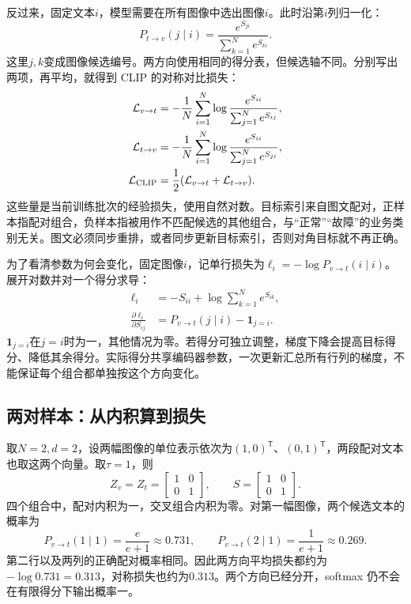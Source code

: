 反过来，固定文本$i$，模型需要在所有图像中选出图像$i$。此时沿第$i$列归一化：
\begin{equation}
 P_{t\to v}(j\mid i)=\frac{e^{S_{ji}}}{\sum_{k=1}^N e^{S_{ki}}}.
\end{equation}
这里$j,k$变成图像候选编号。两方向使用相同的得分表，但候选轴不同。分别写出两项，再平均，就得到 CLIP 的对称对比损失：
\begin{align}
 \mathcal L_{v\to t}&=-\frac1N\sum_{i=1}^N
 \log\frac{e^{S_{ii}}}{\sum_{j=1}^N e^{S_{ij}}},\\
 \mathcal L_{t\to v}&=-\frac1N\sum_{i=1}^N
 \log\frac{e^{S_{ii}}}{\sum_{j=1}^N e^{S_{ji}}},\\
 \mathcal L_{\rm CLIP}&=\frac12
 (\mathcal L_{v\to t}+\mathcal L_{t\to v}).
 \label{eq:multimodal-clip-loss}
\end{align}
这些量是当前训练批次的经验损失，使用自然对数。目标索引来自图文配对，正样本指配对组合，负样本指被用作不匹配候选的其他组合，与“正常”“故障”的业务类别无关。图文必须同步重排，或者同步更新目标索引，否则对角目标就不再正确。

为了看清参数为何会变化，固定图像$i$，记单行损失为$\ell_i=-\log P_{v\to t}(i\mid i)$。展开对数并对一个得分求导：
\begin{align}
 \ell_i&=-S_{ii}+\log\sum_{k=1}^N e^{S_{ik}},\\
 \frac{\partial\ell_i}{\partial S_{ij}}
 &=P_{v\to t}(j\mid i)-\mathbf1_{j=i}.\label{eq:multimodal-clip-score-gradient}
\end{align}
$\mathbf1_{j=i}$在$j=i$时为一，其他情况为零。若得分可独立调整，梯度下降会提高目标得分、降低其余得分。实际得分共享编码器参数，一次更新汇总所有行列的梯度，不能保证每个组合都单独按这个方向变化。

\subsection{两对样本：从内积算到损失}
取$N=2,d=2$，设两幅图像的单位表示依次为$(1,0)^{\mathsf T}$、$(0,1)^{\mathsf T}$，两段配对文本也取这两个向量。取$\tau=1$，则
\begin{equation}
 Z_v=Z_t=\begin{bmatrix}1&0\\0&1\end{bmatrix},\qquad
 S=\begin{bmatrix}1&0\\0&1\end{bmatrix}.
\end{equation}
四个组合中，配对内积为一，交叉组合内积为零。对第一幅图像，两个候选文本的概率为
\begin{equation}
 P_{v\to t}(1\mid1)=\frac{e}{e+1}\approx0.731,\qquad
 P_{v\to t}(2\mid1)=\frac1{e+1}\approx0.269.
\end{equation}
第二行以及两列的正确配对概率相同。因此两方向平均损失都约为$-\log0.731=0.313$，对称损失也约为$0.313$。两个方向已经分开，softmax 仍不会在有限得分下输出概率一。

